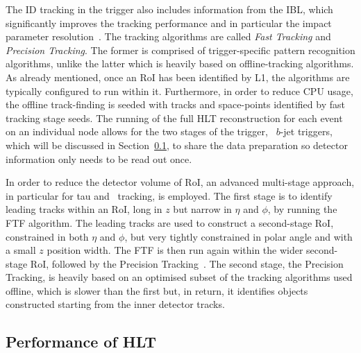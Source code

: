 			The ID tracking in the trigger also includes information from the IBL, which significantly improves the tracking performance and in particular the impact parameter resolution~\cite{IBLTDR}. The tracking algorithms are called \emph{Fast Tracking} and \emph{Precision Tracking}. The former is comprised of trigger-specific pattern recognition algorithms, unlike the latter which is heavily based on offline-tracking algorithms.
			As already mentioned, once an \ac{RoI} has been identified by \ac{L1}, the algorithms are typically configured to run within it. Furthermore, in order to reduce \ac{CPU} usage, the offline track-finding is seeded with tracks and space-points identified by fast tracking stage seeds. The running of the full \ac{HLT} reconstruction for each event on an individual node allows for the two stages of the trigger, \eg\ $b$-jet triggers, which will be discussed in Section~\ref{sec:Trig_perf}, to share the data preparation so detector information only needs to be read out once. 

			In order to reduce the detector volume of \ac{RoI}, an advanced multi-stage approach, in particular for tau and \bj\ tracking, is employed. The first stage is to identify leading tracks within an \ac{RoI}, long in $z$ but narrow in $\eta$ and $\phi$, by running the \ac{FTF} algorithm. The leading tracks are used to construct a second-stage \ac{RoI}, constrained in both $\eta$ and $\phi$, but very tightly constrained in polar angle and with a small $z$ position width. The \ac{FTF} is then run again within the wider second-stage \ac{RoI}, followed by the Precision Tracking~\cite{ATLASTrigger2015, Miano:2016oty}. The second stage, the Precision Tracking, is heavily based on an optimised subset of the tracking algorithms used offline, which is slower than the first but, in return, it identifies objects constructed starting from the inner detector tracks.



		\subsection{Performance of HLT}
		\label{sec:Trig_perf}

